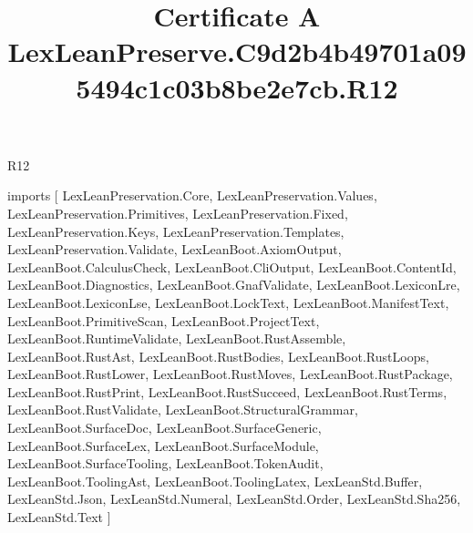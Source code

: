 \begin{lexlean}{R12}
\title{Certificate A LexLeanPreserve.C9d2b4b49701a095494c1c03b8be2e7cb.R12}
\begin{coremodule}
imports [
  LexLeanPreservation.Core,
  LexLeanPreservation.Values,
  LexLeanPreservation.Primitives,
  LexLeanPreservation.Fixed,
  LexLeanPreservation.Keys,
  LexLeanPreservation.Templates,
  LexLeanPreservation.Validate,
  LexLeanBoot.AxiomOutput,
  LexLeanBoot.CalculusCheck,
  LexLeanBoot.CliOutput,
  LexLeanBoot.ContentId,
  LexLeanBoot.Diagnostics,
  LexLeanBoot.GnafValidate,
  LexLeanBoot.LexiconLre,
  LexLeanBoot.LexiconLse,
  LexLeanBoot.LockText,
  LexLeanBoot.ManifestText,
  LexLeanBoot.PrimitiveScan,
  LexLeanBoot.ProjectText,
  LexLeanBoot.RuntimeValidate,
  LexLeanBoot.RustAssemble,
  LexLeanBoot.RustAst,
  LexLeanBoot.RustBodies,
  LexLeanBoot.RustLoops,
  LexLeanBoot.RustLower,
  LexLeanBoot.RustMoves,
  LexLeanBoot.RustPackage,
  LexLeanBoot.RustPrint,
  LexLeanBoot.RustSucceed,
  LexLeanBoot.RustTerms,
  LexLeanBoot.RustValidate,
  LexLeanBoot.StructuralGrammar,
  LexLeanBoot.SurfaceDoc,
  LexLeanBoot.SurfaceGeneric,
  LexLeanBoot.SurfaceLex,
  LexLeanBoot.SurfaceModule,
  LexLeanBoot.SurfaceTooling,
  LexLeanBoot.TokenAudit,
  LexLeanBoot.ToolingAst,
  LexLeanBoot.ToolingLatex,
  LexLeanStd.Buffer,
  LexLeanStd.Json,
  LexLeanStd.Numeral,
  LexLeanStd.Order,
  LexLeanStd.Sha256,
  LexLeanStd.Text
]


\end{coremodule}
\end{lexlean}
